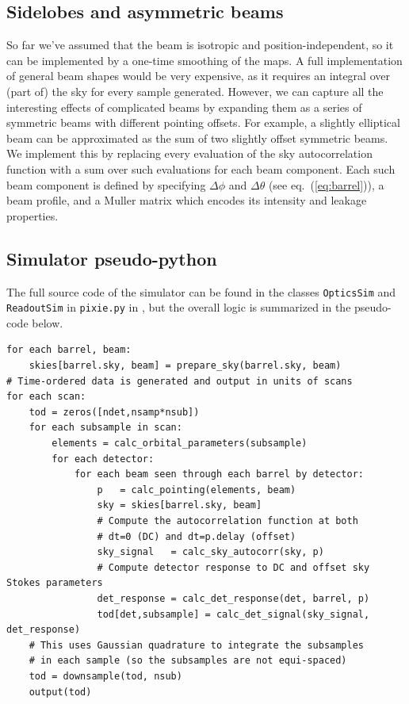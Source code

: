 \documentclass{article}
\begin{document}
\subsection{Sidelobes and asymmetric beams}
So far we've assumed that the beam is isotropic and position-independent,
so it can be implemented by a one-time smoothing of the maps. A full
implementation of general beam shapes would be very expensive, as it
requires an integral over (part of) the sky for every sample generated.
However, we can capture all the interesting effects of complicated beams
by expanding them as a series of symmetric beams with different pointing
offsets. For example, a slightly elliptical beam can be approximated as
the sum of two slightly offset symmetric beams.
We implement this by replacing every evaluation of the sky autocorrelation
function with a sum over such evaluations for each beam component.
Each such beam component is defined by specifying
$\Delta\phi$ and $\Delta\theta$ (see eq.~(\ref{eq:barrel})),
a beam profile, and a Muller matrix which encodes its
intensity and leakage properties.

\subsection{Simulator pseudo-python}
The full source code of the simulator can be found in the
classes \texttt{OpticsSim} and \texttt{ReadoutSim} in
\texttt{pixie.py} in \cite{pixie_repo}, but the
overall logic is summarized in the pseudo-code below.
\begin{lstlisting}
for each barrel, beam:
	skies[barrel.sky, beam] = prepare_sky(barrel.sky, beam)
# Time-ordered data is generated and output in units of scans
for each scan:
	tod = zeros([ndet,nsamp*nsub])
	for each subsample in scan:
		elements = calc_orbital_parameters(subsample)
		for each detector:
			for each beam seen through each barrel by detector:
				p   = calc_pointing(elements, beam)
				sky = skies[barrel.sky, beam]
				# Compute the autocorrelation function at both
				# dt=0 (DC) and dt=p.delay (offset)
				sky_signal   = calc_sky_autocorr(sky, p)
				# Compute detector response to DC and offset sky Stokes parameters
				det_response = calc_det_response(det, barrel, p)
				tod[det,subsample] = calc_det_signal(sky_signal, det_response)
	# This uses Gaussian quadrature to integrate the subsamples
	# in each sample (so the subsamples are not equi-spaced)
	tod = downsample(tod, nsub)
	output(tod)
\end{lstlisting}
\end{document}
